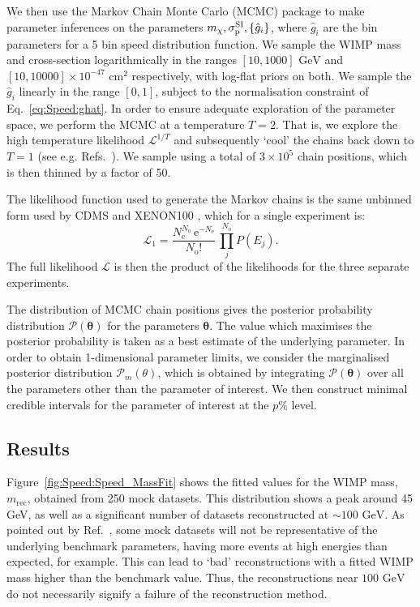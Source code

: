  We then use the Markov Chain Monte Carlo (MCMC) package \cosmomc \cite{Lewis:2002} to make parameter inferences on the parameters $\mchi, \sigmapsi, \left\{\hat{g}_i\right\}$, where $\hat{g}_i$ are the bin parameters for a 5 bin speed distribution function. We sample the WIMP mass and cross-section logarithmically in the ranges \([10, 1000] \textrm{ GeV}\) and \([10, 10000] \times 10^{-47} \textrm{ cm}^2\) respectively, with log-flat priors on both. We sample the $\hat{g}_i$ linearly in the range $[0,1]$, subject to the normalisation constraint of Eq.~\ref{eq:Speed:ghat}. In order to ensure adequate exploration of the parameter space, we perform the MCMC at a temperature $T=2$. That is, we explore the high temperature likelihood $\mathcal{L}^{1/T}$ and subsequently `cool' the chains back down to $T=1$ (see e.g. Refs.~\cite{Kirkpatrick:1983,Skilling:2009}). We sample using a total of $3 \times 10^5$ chain positions, which is then thinned by a factor of 50.

The likelihood function used to generate the Markov chains is the same unbinned form used by CDMS \cite{Ahmed:2009b} and XENON100 \cite{Aprile:2011}, which for a single experiment is:
\begin{equation}
\label{eq:Speed:unbinnedL}
\mathcal{L}_1 = \frac{N_\textrm{e}^{N_\textrm{o}}\, \textrm{e}^{-N_\textrm{e}}}{N_\textrm{o}!} \, \prod_j^{N_\textrm{o}} P(E_j).
\end{equation} 
The full likelihood \(\mathcal{L}\) is then the product of the likelihoods for the three separate experiments.

The distribution of MCMC chain positions gives the posterior probability distribution $\mathcal{P}(\mathbf{\theta})$ for the parameters $\mathbf{\theta}$. The value which maximises the posterior probability is taken as a best estimate of the underlying parameter. In order to obtain 1-dimensional parameter limits, we consider the marginalised posterior distribution $\mathcal{P}_m(\theta)$, which is obtained by integrating $\mathcal{P}(\mathbf{\theta})$ over all the parameters other than the parameter of interest. We then construct minimal credible intervals for the parameter of interest at the $p\%$ level. 

\subsection{Results}
Figure~\ref{fig:Speed:Speed_MassFit} shows the fitted values for the WIMP mass, \(m_\textrm{rec}\), obtained from 250 mock datasets. This distribution shows a peak around 45 GeV, as well as a significant number of datasets reconstructed at \(\sim 100 \textrm{ GeV}\). As pointed out by Ref.\ \cite{Strege:2012}, some mock datasets will not be representative of the underlying benchmark parameters, having more events at high energies than expected, for example. This can lead to `bad' reconstructions with a fitted WIMP mass higher than the benchmark value. Thus, the reconstructions near \(100 \textrm{ GeV}\) do not necessarily signify a failure of the reconstruction method.

